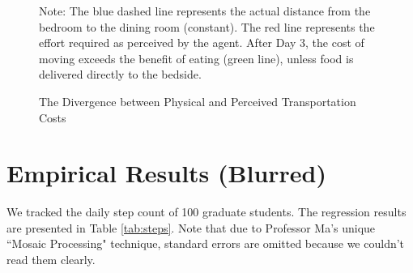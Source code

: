 \documentclass[AER]{AEA}
\begin{document}
\begin{figure}[ht]
\centering
{}

\caption{The Divergence between Physical and Perceived Transportation Costs}
\label{fig:cost_curve}
\begin{figurenotes}
Note: The blue dashed line represents the actual distance from the bedroom to the dining room (constant). The red line represents the effort required as perceived by the agent. After Day 3, the cost of moving exceeds the benefit of eating (green line), unless food is delivered directly to the bedside.
\end{figurenotes}
\end{figure}

\section{Empirical Results (Blurred)}

We tracked the daily step count of 100 graduate students. The regression results are presented in Table \ref{tab:steps}. Note that due to Professor Ma's unique ``Mosaic Processing" technique, standard errors are omitted because we couldn't read them clearly.
\end{document}
